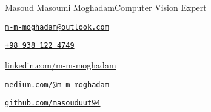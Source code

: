 \documentclass{article}
\begin{document}
\begin{cv}[avatar]{Masoud Masoumi Moghadam}{Computer Vision Expert}
\cvsidebar %


\begin{cvitem}[Envelope][4]
    \href{mailto:m-m-moghadam@outlook.com}{\texttt{m-m-moghadam@outlook.com}}
\end{cvitem}

\cvseparator[3]
\begin{cvitem}[Phone][4]
    \href{tel:+989381224749}{\texttt{+98 938 122 4749}}
\end{cvitem}

\cvseparator[3]
\begin{cvitem}[Linkedin][4]
    \href{https://www.linkedin.com/in/m-m-moghadam/}{linkedin.com/m-m-moghadam}
\end{cvitem}

\cvseparator[3]
\begin{cvitem}[Medium][4]
    \href{https://medium.com/@m-m-moghadam}{\texttt{medium.com/@m-m-moghadam}}
\end{cvitem}

\cvseparator[3]
\begin{cvitem}[Github][4]
    \href{https://github.com/masouduut94}{\texttt{github.com/masouduut94}}
\end{cvitem}



\end{cv}
\end{document}
